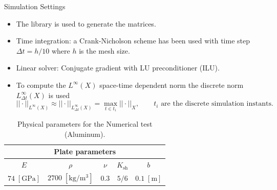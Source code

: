 \documentclass[aspectratio=169]{ISAE-Beamer}
\begin{document}
\begin{frame}{Simulation Settings}
\begin{itemize}
	\item The {} library is used to generate the matrices. 
	\item Time integration: a Crank-Nicholson scheme has been used with time step $\Delta t = h/10$ where $h$ is the mesh size.
	\item Linear solver: Conjugate gradient with LU preconditioner (ILU).
	\item To compute the $L^\infty ({X})$ space-time dependent norm  the discrete norm $L^\infty_{\Delta t} ({X})$ is used
	\[
	||\cdot ||_{L^\infty ({X})} \approx || \cdot ||_{L^\infty_{\Delta t} ({X})} = \max_{t \in t_i} ||\cdot||_{{X}}, \qquad \text{$t_i$ are the discrete simulation instants.}
	\]
\end{itemize}

 \begin{table}[htbp]
 	\centering
 	\begin{tabular}{ccccc}
 		\hline 
 		\multicolumn{5}{c}{Plate parameters} \\ 
 		\hline 
 		$E$ & $\rho$ & $\nu$ & $K_{\text{sh}}$ & $b$ \\
 		$74 \;  [\textrm{GPa}]$ & $2700\; [\textrm{kg}/\textrm{m}^3]$ & $0.3$ & $5/6$ &  $0.1 \;  [\textrm{m}]$\\ 
 		\hline 
 	\end{tabular} 
 	\caption{Physical parameters for the Numerical test (Aluminum).}
 \end{table}
\end{frame}
\end{document}
